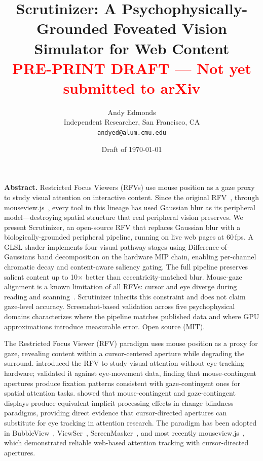 \documentclass[10pt,twocolumn,letterpaper]{article}
\title{\vspace{-8pt}\textbf{Scrutinizer: A Psychophysically-Grounded Foveated Vision Simulator for Web Content}\\[4pt]
{\normalfont\small\textcolor{red}{PRE-PRINT DRAFT --- Not yet submitted to arXiv}}\vspace{-4pt}}
\author{
  Andy Edmonds\\[-2pt]
  {\small Independent Researcher, San Francisco, CA}\\[-2pt]
  {\small\texttt{andyed@alum.cmu.edu}}
}
\date{\vspace{-4pt}\small Draft of \today\vspace{-8pt}}
\makeatletter
\renewcommand\section{\@startsection{section}{1}{\z@}{5pt}{2pt}{\normalfont\bfseries\normalsize}}
\renewenvironment{abstract}{\small\noindent\textbf{Abstract.}\enspace\ignorespaces}{\par\vspace{4pt}}
\makeatother
\begin{document}
\maketitle
\vspace{-6pt}

\begin{abstract}
Restricted Focus Viewers (RFVs) use mouse position as a gaze proxy to study visual attention on interactive content. Since the original RFV~\citep{blackwell2003}, through mouseview.js~\citep{anwylirvine2021}, every tool in this lineage has used Gaussian blur as its peripheral model---destroying spatial structure that real peripheral vision preserves. We present Scrutinizer, an open-source RFV that replaces Gaussian blur with a biologically-grounded peripheral pipeline, running on live web pages at 60\,fps. A GLSL shader implements four visual pathway stages using Difference-of-Gaussians band decomposition on the hardware MIP chain, enabling per-channel chromatic decay and content-aware saliency gating. The full pipeline preserves salient content up to 10$\times$ better than eccentricity-matched blur. Mouse-gaze alignment is a known limitation of all RFVs: cursor and eye diverge during reading and scanning~\citep{huang2012}. Scrutinizer inherits this constraint and does not claim gaze-level accuracy. Screenshot-based validation across five psychophysical domains characterizes where the pipeline matches published data and where GPU approximations introduce measurable error. Open source (MIT).
\end{abstract}

\section{Introduction}

The Restricted Focus Viewer (RFV) paradigm uses mouse position as a proxy for gaze, revealing content within a cursor-centered aperture while degrading the surround. \citet{blackwell2003} introduced the RFV to study visual attention without eye-tracking hardware; \citet{bednarik2007} validated it against eye-movement data, finding that mouse-contingent apertures produce fixation patterns consistent with gaze-contingent ones for spatial attention tasks. \citet{chetverikov2018} showed that mouse-contingent and gaze-contingent displays produce equivalent implicit processing effects in change blindness paradigms, providing direct evidence that cursor-directed apertures can substitute for eye tracking in attention research. The paradigm has been adopted in BubbleView~\citep{kim2017}, ViewSer~\citep{lagun2011}, ScreenMasker~\citep{orlov2016}, and most recently mouseview.js~\citep{anwylirvine2021}, which demonstrated reliable web-based attention tracking with cursor-directed apertures.
\end{document}
